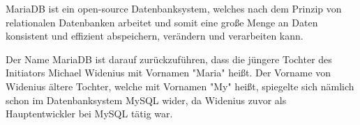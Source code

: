 
MariaDB ist ein open-source Datenbanksystem, welches nach dem Prinzip von relationalen Datenbanken arbeitet und somit eine große Menge an Daten konsistent und effizient abspeichern, verändern und verarbeiten kann.

Der Name MariaDB ist darauf zurückzuführen, dass die jüngere Tochter des Initiators Michael Widenius mit Vornamen "Maria" heißt. Der Vorname von Widenius ältere Tochter, welche mit Vornamen "My" heißt, spiegelte sich nämlich schon im Datenbanksystem MySQL wider, da Widenius zuvor als Hauptentwickler bei MySQL tätig war. \cite{MariaWiki}